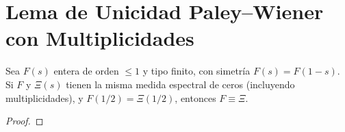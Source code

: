 \section{Lema de Unicidad Paley--Wiener con Multiplicidades}

\begin{lemma}
Sea $F(s)$ entera de orden $\leq 1$ y tipo finito, con simetría $F(s)=F(1-s)$.
Si $F$ y $\Xi(s)$ tienen la misma medida espectral de ceros (incluyendo multiplicidades),
y $F(1/2)=\Xi(1/2)$, entonces $F \equiv \Xi$.
\end{lemma}

\begin{proof}
\end{proof}
